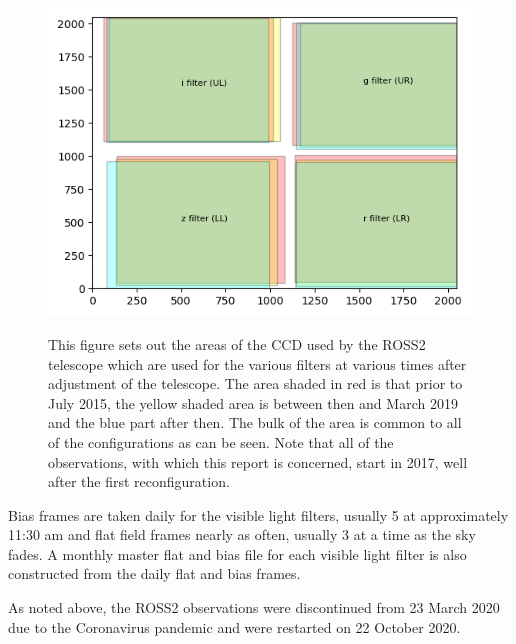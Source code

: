 \begin{figure}[!htbp]
\begin{center}
\includegraphics[scale=1]{images/showusedccd.png} \\
\end{center}   
\caption{This figure sets out the areas of the CCD used by the ROSS2
telescope which are used for the various filters at various times after
adjustment of the telescope. The area shaded in red is that prior to July 2015, the yellow shaded area is between
then and March 2019 and the blue part after then. The bulk of the area is
common to all of the configurations as can be seen. Note that all of the
{\rdwarf} observations, with which this report is concerned, start in 2017, well
after the first reconfiguration.} \protect\label{fig:showusedccd}
\end{figure}

Bias frames are taken daily for the visible light filters, usually 5 at
approximately 11:30 am and flat field frames nearly as often, usually 3 at a
time as the sky fades. A monthly master flat and bias file for each visible
light filter is also constructed from the daily flat and bias frames.

As noted above, the ROSS2 observations were discontinued from 23 March 2020 due
to the Coronavirus pandemic and were restarted on 22 October 2020.

